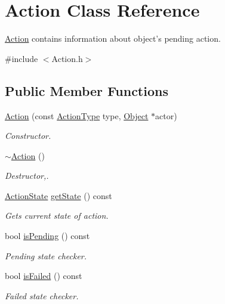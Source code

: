 \hypertarget{classAction}{\section{Action Class Reference}
\label{classAction}
}


\hyperlink{classAction}{Action} contains information about object's pending action.  




{\ttfamily \#include $<$Action.\-h$>$}

\subsection*{Public Member Functions}
\begin{DoxyCompactItemize}
\item 
\hyperlink{classAction_aa2f7cc08a31de184271b858ad1a1531b}{Action} (const \hyperlink{BasicTypes_8h_a21d5e8f8cdaa838586b31007df0a950b}{Action\-Type} type, \hyperlink{classObject}{Object} $\ast$actor)
\begin{DoxyCompactList}\small\item\em Constructor. \end{DoxyCompactList}\item 
\hyperlink{classAction_acdb06775d157339256a8ecd55749226c}{$\sim$\-Action} ()
\begin{DoxyCompactList}\small\item\em Destructor,. \end{DoxyCompactList}\item 
\hyperlink{BasicTypes_8h_adc11d0d0b524594e66cd33dcc6513a3e}{Action\-State} \hyperlink{classAction_a08cc1ad2958501d86057c16cc6a6d7cf}{get\-State} () const 
\begin{DoxyCompactList}\small\item\em Gets current state of action. \end{DoxyCompactList}\item 
bool \hyperlink{classAction_ae0e419e952716c6ba3d88bcd68b8859b}{is\-Pending} () const 
\begin{DoxyCompactList}\small\item\em Pending state checker. \end{DoxyCompactList}\item 
bool \hyperlink{classAction_a9c8b3fb9d7133c60449c2ad380f491fe}{is\-Failed} () const 
\begin{DoxyCompactList}\small\item\em Failed state checker. \end{DoxyCompactList}\item 

\end{DoxyCompactItemize}
